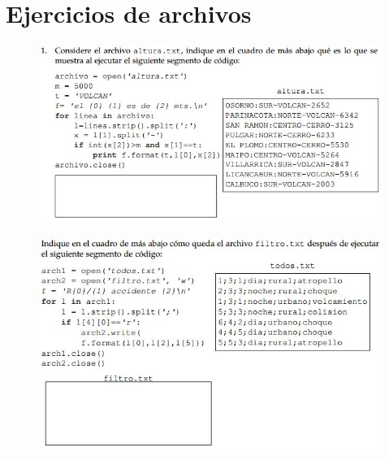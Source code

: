 \section{Ejercicios de archivos}
\begin{figure}[h]
    \centering
    \includegraphics{Guia/imagen2.jpg}
\end{figure}
\begin{figure}[h]
    \centering
    \includegraphics{Guia/imagen3.jpg}
\end{figure}